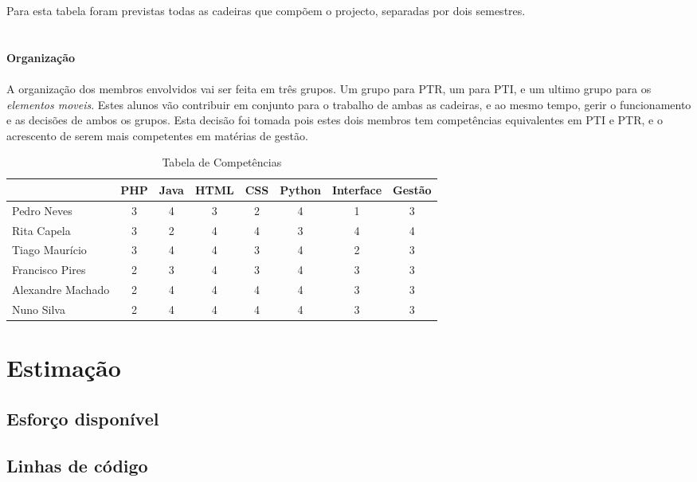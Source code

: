 \documentclass[12pt, a4paper, twoside]{report} %
\begin{document}
Para esta tabela foram previstas todas as cadeiras que compõem o projecto, separadas por dois semestres. 
\\
\\
\\
\textbf{Organização}
\\
\\
A organização dos membros envolvidos vai ser feita em três grupos.
Um grupo para PTR, um para PTI, e um ultimo grupo para os \textit {elementos moveis}. 
Estes alunos vão contribuir em conjunto para o trabalho de ambas as cadeiras, e ao mesmo tempo, gerir o funcionamento e as decisões de ambos os grupos.
Esta decisão foi tomada pois estes dois membros tem competências equivalentes em PTI e PTR, e o acrescento de serem mais competentes em matérias de gestão.

\begin{table}[h]
\centering
\begin{tabular}{|l|c|c|c|c|c|c|c|}
\hline
                  & PHP & Java & HTML & CSS & Python & Interface & Gestão \\ \hline
Pedro Neves       & 3   & 4    & 3    & 2   & 4      & 1         & 3      \\ \hline
Rita Capela       & 3   & 2    & 4    & 4   & 3      & 4         & 4      \\ \hline
Tiago Maurício    & 3   & 4    & 4    & 3   & 4      & 2         & 3      \\ \hline
Francisco Pires   & 2   & 3    & 4    & 3   & 4      & 3         & 3      \\ \hline
Alexandre Machado & 2   & 4    & 4    & 4   & 4      & 3         & 3      \\ \hline
Nuno Silva        & 2   & 4    & 4    & 4   & 4      & 3         & 3      \\ \hline
\end{tabular}
\caption{Tabela de Competências}
\label{competencias}
\end{table}


\section{Estimação}


\subsection{Esforço disponível}


\subsection{Linhas de código}
\end{document}
